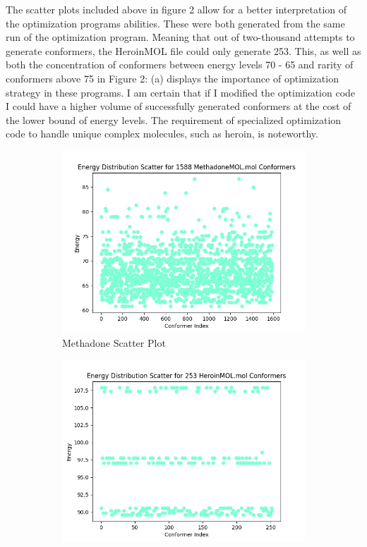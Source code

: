 \documentclass[a4paper,10pt]{article}
\begin{document}
The scatter plots included above in figure 2 allow for a better interpretation of the optimization programs abilities. These were both generated from the same run of the optimization program. Meaning that out of two-thousand attempts to generate conformers, the HeroinMOL file could only generate 253. This, as well as both the concentration of conformers between energy levels 70 - 65 and rarity of conformers above 75 in Figure 2: (a) displays the importance of optimization strategy in these programs. I am certain that if I modified the optimization code I could have a higher volume of successfully generated conformers at the cost of the lower bound of energy levels. The requirement of specialized optimization code to handle unique complex molecules, such as heroin, is noteworthy.


\begin{figure}[H]
    \centering
    \begin{subfigure}{0.45\textwidth}
        \centering
        \includegraphics[width=\linewidth]{imgs/MethadoneMOL_Energy_Scatter.png}
        \caption{Methadone Scatter Plot}
        \label{fig:image1}
    \end{subfigure}
    \hfill
    \begin{subfigure}{0.45\textwidth}
        \centering
        \includegraphics[width=\linewidth]{imgs/HeroinMOL_Energy_Scatter.png}

\end{subfigure}
\end{figure}
\end{document}
